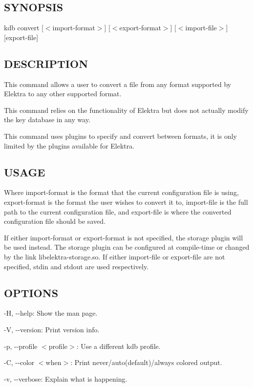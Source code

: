 \subsection*{S\+Y\+N\+O\+P\+S\+IS}

{\ttfamily kdb convert \mbox{[}$<$import-\/format$>$\mbox{]} \mbox{[}$<$export-\/format$>$\mbox{]} \mbox{[}$<$import-\/file$>$\mbox{]} \mbox{[}export-\/file\mbox{]}}

\subsection*{D\+E\+S\+C\+R\+I\+P\+T\+I\+ON}

This command allows a user to convert a file from any format supported by Elektra to any other supported format.

This command relies on the functionality of Elektra but does not actually modify the key database in any way.

This command uses plugins to specify and convert between formats, it is only limited by the plugins available for Elektra.

\subsection*{U\+S\+A\+GE}

Where {\ttfamily import-\/format} is the format that the current configuration file is using, {\ttfamily export-\/format} is the format the user wishes to convert it to, {\ttfamily import-\/file} is the full path to the current configuration file, and {\ttfamily export-\/file} is where the converted configuration file should be saved.

If either {\ttfamily import-\/format} or {\ttfamily export-\/format} is not specified, the {\ttfamily storage} plugin will be used instead. The {\ttfamily storage} plugin can be configured at compile-\/time or changed by the link {\ttfamily libelektra-\/storage.\+so}. If either {\ttfamily import-\/file} or {\ttfamily export-\/file} are not specified, {\ttfamily stdin} and {\ttfamily stdout} are used respectively.

\subsection*{O\+P\+T\+I\+O\+NS}


\begin{DoxyItemize}
\item {\ttfamily -\/H}, {\ttfamily -\/-\/help}\+: Show the man page.
\item {\ttfamily -\/V}, {\ttfamily -\/-\/version}\+: Print version info.
\item {\ttfamily -\/p}, {\ttfamily -\/-\/profile $<$profile$>$}\+: Use a different kdb profile.
\item {\ttfamily -\/C}, {\ttfamily -\/-\/color $<$when$>$}\+: Print never/auto(default)/always colored output.
\item {\ttfamily -\/v}, {\ttfamily -\/-\/verbose}\+: Explain what is happening.
\end{DoxyItemize}

